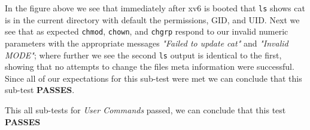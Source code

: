 \documentclass[11pt,letterpaper]{report}
\begin{document}
\pagebreak
In the figure above we see that immediately after xv6 is booted that {\tt ls} shows cat is in the current directory with default the permissions, GID, and UID. Next we see that as expected {\tt chmod}, {\tt chown}, and {\tt chgrp} 
respond to our invalid numeric parameters with the appropriate messages \emph{"Failed to update cat"} and \emph{"Invalid MODE"}; where further we see the 
second {\tt ls} output is identical to the first, showing that no attempts to change the files meta information were successful. Since all of our expectations for this sub-test were met we can conclude
that this sub-test \textbf{PASSES}.

This all sub-tests for \emph{User Commands} passed, we can conclude that this test \textbf{PASSES}
		
\end{document}
